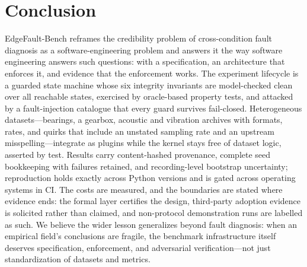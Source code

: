 \section{Conclusion}
\label{sec:conclusion}

EdgeFault-Bench reframes the credibility problem of cross-condition fault
diagnosis as a software-engineering problem and answers it the way software
engineering answers such questions: with a specification, an architecture
that enforces it, and evidence that the enforcement works. The experiment
lifecycle is a guarded state machine whose six integrity invariants are
model-checked clean over all reachable states, exercised by oracle-based
property tests, and attacked by a fault-injection catalogue that every
guard survives fail-closed. Heterogeneous datasets---bearings, a gearbox,
acoustic and vibration archives with formats, rates, and quirks that
include an unstated sampling rate and an upstream misspelling---integrate
as plugins while the kernel stays free of dataset logic, asserted by test.
Results carry content-hashed provenance, complete seed bookkeeping with
failures retained, and recording-level bootstrap uncertainty; reproduction
holds exactly across Python versions and is gated across operating systems
in CI. The costs are measured, and the boundaries are stated where evidence
ends: the formal layer certifies the design, third-party adoption evidence
is solicited rather than claimed, and non-protocol demonstration runs are
labelled as such. We believe the wider lesson generalizes beyond fault
diagnosis: when an empirical field's conclusions are fragile, the benchmark
infrastructure itself deserves specification, enforcement, and adversarial
verification---not just standardization of datasets and metrics.
